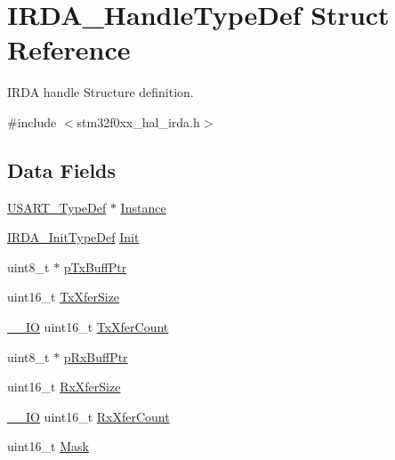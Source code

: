 \hypertarget{struct_i_r_d_a___handle_type_def}{}\section{I\+R\+D\+A\+\_\+\+Handle\+Type\+Def Struct Reference}
\label{struct_i_r_d_a___handle_type_def}


I\+R\+DA handle Structure definition.  




{\ttfamily \#include $<$stm32f0xx\+\_\+hal\+\_\+irda.\+h$>$}

\subsection*{Data Fields}
\begin{DoxyCompactItemize}
\item 
\hyperlink{struct_u_s_a_r_t___type_def}{U\+S\+A\+R\+T\+\_\+\+Type\+Def} $\ast$ \hyperlink{struct_i_r_d_a___handle_type_def_a2b30b6d22df80fbebd8ceefc6f162310}{Instance}
\item 
\hyperlink{struct_i_r_d_a___init_type_def}{I\+R\+D\+A\+\_\+\+Init\+Type\+Def} \hyperlink{struct_i_r_d_a___handle_type_def_afd099a0cd7d746a2685c4dd17878d461}{Init}
\item 
uint8\+\_\+t $\ast$ \hyperlink{struct_i_r_d_a___handle_type_def_a5cc31f7c52dafd32f27f8f2756dbf343}{p\+Tx\+Buff\+Ptr}
\item 
uint16\+\_\+t \hyperlink{struct_i_r_d_a___handle_type_def_a80907b65d6f9541bc0dee444d16bc45b}{Tx\+Xfer\+Size}
\item 
\hyperlink{core__sc300_8h_aec43007d9998a0a0e01faede4133d6be}{\+\_\+\+\_\+\+IO} uint16\+\_\+t \hyperlink{struct_i_r_d_a___handle_type_def_a1823437fbed80bdd1510782ced4e5532}{Tx\+Xfer\+Count}
\item 
uint8\+\_\+t $\ast$ \hyperlink{struct_i_r_d_a___handle_type_def_a7cee540cb21048ac48ba17355440e668}{p\+Rx\+Buff\+Ptr}
\item 
uint16\+\_\+t \hyperlink{struct_i_r_d_a___handle_type_def_ac12f5f1f6295b3c3327d5feabf5a96fb}{Rx\+Xfer\+Size}
\item 
\hyperlink{core__sc300_8h_aec43007d9998a0a0e01faede4133d6be}{\+\_\+\+\_\+\+IO} uint16\+\_\+t \hyperlink{struct_i_r_d_a___handle_type_def_ad95a26d6b12b7087bba3d1b769175db2}{Rx\+Xfer\+Count}
\item 
uint16\+\_\+t \hyperlink{struct_i_r_d_a___handle_type_def_ab8dae64f3b86c2eb2b7a080fcdee3ef4}{Mask}
\item 

\end{DoxyCompactItemize}
